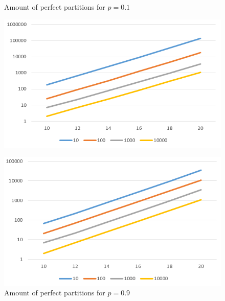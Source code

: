 \begin{figure}[h]
      \centering
      \begin{minipage}[b]{0.45\textwidth}
            \caption{Amount of perfect partitions for $p=0.1$}
            \includegraphics[width=\textwidth]{figures/images/solvabilityOfInputs/perfectPartitionCount-p0_1.png}\label{fig:firstBinSolCount}
      \end{minipage}
      \hspace{0.75cm}
      \begin{minipage}[b]{0.45\textwidth}
            \caption{Amount of perfect partitions for $p=0.9$}
            \includegraphics[width=\textwidth]{figures/images/solvabilityOfInputs/perfectPartitionCount-p0_9.png}
      \end{minipage}
\end{figure}


